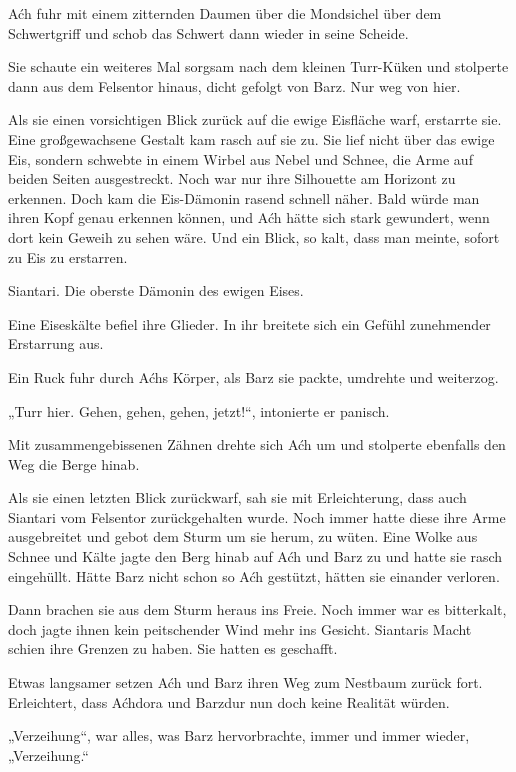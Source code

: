 Aćh fuhr mit einem zitternden Daumen über die Mondsichel über dem Schwertgriff und schob das Schwert dann wieder in seine Scheide.

Sie schaute ein weiteres Mal sorgsam nach dem kleinen Turr-Küken und stolperte dann aus dem Felsentor hinaus, dicht gefolgt von Barz. Nur weg von hier.

Als sie einen vorsichtigen Blick zurück auf die ewige Eisfläche warf, erstarrte sie. Eine großgewachsene Gestalt kam rasch auf sie zu. Sie lief nicht über das ewige Eis, sondern schwebte in einem Wirbel aus Nebel und Schnee, die Arme auf beiden Seiten ausgestreckt. Noch war nur ihre Silhouette am Horizont zu erkennen. Doch kam die Eis-Dämonin rasend schnell näher. Bald würde man ihren Kopf genau erkennen können, und Aćh hätte sich stark gewundert, wenn dort kein Geweih zu sehen wäre. Und ein Blick, so kalt, dass man meinte, sofort zu Eis zu erstarren.

Siantari. Die oberste Dämonin des ewigen Eises.

Eine Eiseskälte befiel ihre Glieder. In ihr breitete sich ein Gefühl zunehmender Erstarrung aus.

Ein Ruck fuhr durch Aćhs Körper, als Barz sie packte, umdrehte und weiterzog.

„Turr hier. Gehen, gehen, gehen, jetzt!“, intonierte er panisch.

Mit zusammengebissenen Zähnen drehte sich Aćh um und stolperte ebenfalls den Weg die Berge hinab.

Als sie einen letzten Blick zurückwarf, sah sie mit Erleichterung, dass auch Siantari vom Felsentor zurückgehalten wurde. Noch immer hatte diese ihre Arme ausgebreitet und gebot dem Sturm um sie herum, zu wüten. Eine Wolke aus Schnee und Kälte jagte den Berg hinab auf Aćh und Barz zu und hatte sie rasch eingehüllt. Hätte Barz nicht schon so Aćh gestützt, hätten sie einander verloren.

Dann brachen sie aus dem Sturm heraus ins Freie. Noch immer war es bitterkalt, doch jagte ihnen kein peitschender Wind mehr ins Gesicht. Siantaris Macht schien ihre Grenzen zu haben. Sie hatten es geschafft.



\trennzeichen



Etwas langsamer setzen Aćh und Barz ihren Weg zum Nestbaum zurück fort. Erleichtert, dass Aćhdora und Barzdur nun doch keine Realität würden.

„Verzeihung“, war alles, was Barz hervorbrachte, immer und immer wieder, „Verzeihung.“

